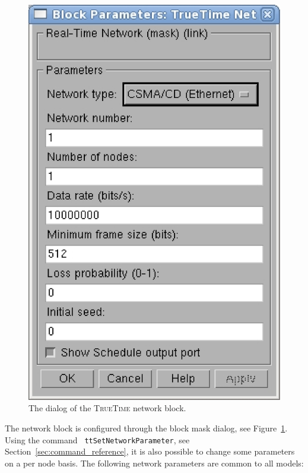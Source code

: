 \documentclass[final,twoside]{rapport}
\begin{document}
\begin{figure}[tbp]
  \centerline{\includegraphics[scale=0.3]{nwdialog.eps}}
  \caption{The dialog of the \textsc{TrueTime} network block.}
  \label{fig:nwdialog}
\end{figure}

The network block is configured through the block mask dialog, see
Figure~\ref{fig:nwdialog}. Using the command {\tt
  ttSetNetworkParameter}, see Section~\ref{sec:command_reference}, it
is also possible to change some parameters on a per node basis. The
following network parameters are common to all models:
\end{document}
